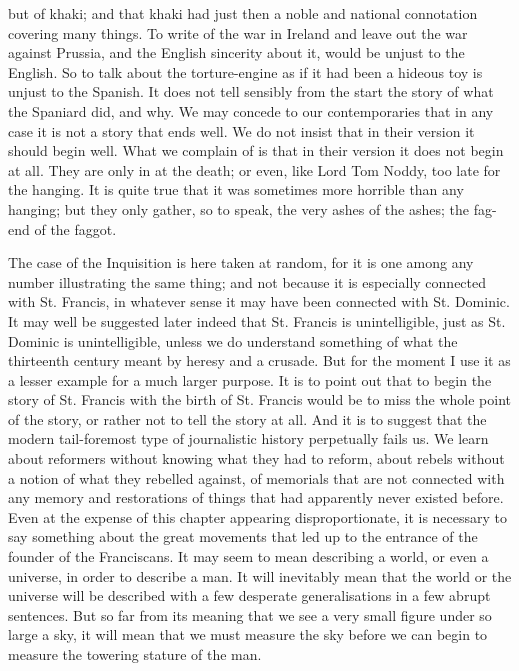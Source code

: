 \documentclass{book}
\begin{document}
but of khaki; and that khaki had just then a noble and national connotation covering many things. To write of the war in Ireland and leave out the war against Prussia, and the English sincerity about it, would be unjust to the English. So to talk about the torture-engine as if it had been a hideous toy is unjust to the Spanish. It does not tell sensibly from the start the story of what the Spaniard did, and why. We may concede to our contemporaries that in any case it is not a story that ends well. We do not insist that in their version it should begin well. What we complain of is that in their version it does not begin at all. They are only in at the death; or even, like Lord Tom Noddy, too late for the hanging. It is quite true that it was sometimes more horrible than any hanging; but they only gather, so to speak, the very ashes of the ashes; the fag-end of the faggot.

The case of the Inquisition is here taken at random, for it is one among any number illustrating the same thing; and not because it is especially connected with St. Francis, in whatever sense it may have been connected with St. Dominic. It may well be suggested later indeed that St. Francis is unintelligible, just as St. Dominic is unintelligible, unless we do understand something of what the thirteenth century meant by heresy and a crusade. But for the moment I use it as a lesser example for a much larger purpose. It is to point out that to begin the story of St. Francis with the birth of St. Francis would be to miss the whole point of the story, or rather not to tell the story at all. And it is to suggest that the modern tail-foremost type of journalistic history perpetually fails us. We learn about reformers without knowing what they had to reform, about rebels without a notion of what they rebelled against, of memorials that are not connected with any memory and restorations of things that had apparently never existed before. Even at the expense of this chapter appearing disproportionate, it is necessary to say something about the great movements that led up to the entrance of the founder of the Franciscans. It may seem to mean describing a world, or even a universe, in order to describe a man. It will inevitably mean that the world or the universe will be described with a few desperate generalisations in a few abrupt sentences. But so far from its meaning that we see a very small figure under so large a sky, it will mean that we must measure the sky before we can begin to measure the towering stature of the man.
\end{document}
